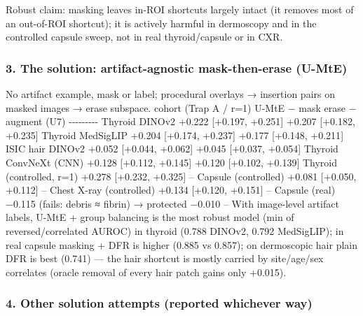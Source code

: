 {Robust claim: masking leaves in-ROI shortcuts largely intact (it removes most of an out-of-ROI shortcut); it is
actively harmful in dermoscopy and in the controlled capsule sweep, not in real thyroid/capsule or in CXR.

\subsubsection{3. The solution: artifact-agnostic mask-then-erase (U-MtE)}\label{3-the-solution-artifact-agnostic-mask-then-erase-u-mte}

No artifact example, mask or label; procedural overlays → insertion pairs on masked images → erase subspace.
\textbar{} cohort (Trap A / r=1) \textbar{} U-MtE − mask \textbar{} erase − augment (U7) \textbar{}
\textbar-\/-\/-\textbar-\/-\/-\textbar-\/-\/-\textbar{}
\textbar{} Thyroid DINOv2 \textbar{} +0.222 {[}+0.197, +0.251{]} \textbar{} +0.207 {[}+0.182, +0.235{]} \textbar{}
\textbar{} Thyroid MedSigLIP \textbar{} +0.204 {[}+0.174, +0.237{]} \textbar{} +0.177 {[}+0.148, +0.211{]} \textbar{}
\textbar{} ISIC hair DINOv2 \textbar{} +0.052 {[}+0.044, +0.062{]} \textbar{} +0.045 {[}+0.037, +0.054{]} \textbar{}
\textbar{} Thyroid ConvNeXt (CNN) \textbar{} +0.128 {[}+0.112, +0.145{]} \textbar{} +0.120 {[}+0.102, +0.139{]} \textbar{}
\textbar{} Thyroid (controlled, r=1) \textbar{} +0.278 {[}+0.232, +0.325{]} \textbar{} -- \textbar{}
\textbar{} Capsule (controlled) \textbar{} +0.081 {[}+0.050, +0.112{]} \textbar{} -- \textbar{}
\textbar{} Chest X-ray (controlled) \textbar{} +0.134 {[}+0.120, +0.151{]} \textbar{} -- \textbar{}
\textbar{} Capsule (real) \textbar{} −0.115 (fails: debris ≈ fibrin) → protected −0.010 \textbar{} -- \textbar{}
With image-level artifact labels, U-MtE + group balancing is the most robust model (min of reversed/correlated
AUROC) in thyroid (0.788 DINOv2, 0.792 MedSigLIP); in real capsule masking + DFR is higher (0.885 vs 0.857); on
dermoscopic hair plain DFR is best (0.741) --- the hair shortcut is mostly carried by site/age/sex correlates (oracle
removal of every hair patch gains only +0.015).

\subsubsection{4. Other solution attempts (reported whichever way)}\label{4-other-solution-attempts-reported-whichever-way}

\begin{itemize}


\end{itemize}}

